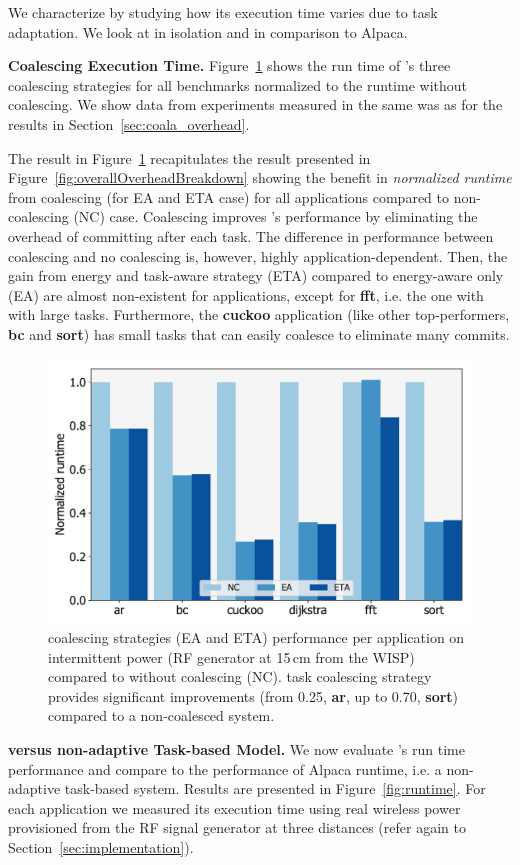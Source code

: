 We characterize \sys by studying how its execution time varies due to task adaptation. We look at \sys in isolation and in comparison to Alpaca.

\textbf{\sys Coalescing Execution Time.}  Figure~\ref{fig:coalescing} shows the run time of \sys's three coalescing strategies for all benchmarks normalized to the \sys runtime without coalescing. We show data from experiments measured in the same was as for the results in Section~\ref{sec:coala_overhead}. 

The result in Figure~\ref{fig:coalescing} recapitulates the result presented in Figure~\ref{fig:overallOverheadBreakdown} showing the benefit in \emph {normalized runtime} from coalescing (for EA and ETA case) for all applications compared to non-coalescing (NC) case. Coalescing improves \sys's performance by eliminating the overhead of committing after each task. The difference in performance between coalescing and no coalescing is, however, highly application-dependent. Then, the gain from energy and task-aware strategy (ETA) compared to energy-aware only (EA) are almost non-existent for applications, except for \textbf{fft}, i.e. the one with with large tasks. Furthermore, the \textbf{cuckoo} application (like other top-performers, \textbf{bc} and \textbf{sort}) has small tasks that \sys can easily coalesce to eliminate many commits.

\begin{figure}
	\centering
	\includegraphics[width=0.5\columnwidth]{figures/coalStrategies}
	\caption{\sys coalescing strategies (EA and ETA) performance per application on intermittent power (RF generator at 15\,cm from the WISP) compared to \sys without coalescing (NC). \sys task coalescing strategy provides significant improvements (from 0.25, \textbf{ar}, up to 0.70, \textbf{sort}) compared to a non-coalesced system.}
	\label{fig:coalescing}
\end{figure}

\textbf{\sys versus non-adaptive Task-based Model.} We now evaluate \sys's run time performance and compare \sys to the performance of Alpaca runtime, i.e. a non-adaptive task-based system. Results are presented in Figure~\ref{fig:runtime}. For each application we measured its execution time using real wireless power provisioned from the RF signal generator at three distances (refer again to Section~\ref{sec:implementation}).

